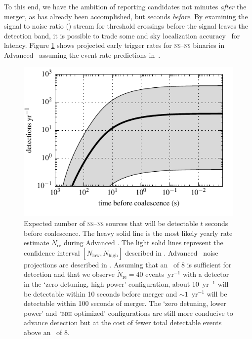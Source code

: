 To this end, we have the ambition of reporting \GW{} candidates
not minutes \emph{after} the merger, as has already been accomplished, but
seconds \emph{before}.  By examining the signal to noise ratio (\SNR{}) stream
for threshold crossings before the \GW{} signal leaves the
detection band, it is possible to trade some \SNR{} and sky localization
accuracy~\cite{Fairhurst2009} for latency.  Figure \ref{fig:earlywarning} shows
projected early trigger rates for \textsc{ns}--\textsc{ns} binaries in Advanced
\LIGO\ assuming the event rate predictions in~\cite{Abadie:2010p10836}.
%
\begin{figure}
\begin{center}
\includegraphics{figures/snr_in_time.pdf}
\caption{\label{fig:earlywarning} Expected number of \textsc{ns}--\textsc{ns} sources that will
be detectable $t$ seconds before coalescence.  The heavy solid line is the most
likely yearly rate estimate $\dot N_{\mathrm{re}}$ during Advanced \LIGO.  The
light solid lines represent the confidence interval $[\dot N_{\mathrm{low}}, \dot 
N_{\mathrm{high}}]$ described in
\cite{Abadie:2010p10836}.  Advanced \LIGO\ noise projections are described in 
\cite{ALIGONoise}.  Assuming that an \SNR\ of 8 is sufficient for
detection and that we observe $\dot N_{\mathrm{re}} = 40$ events~yr$^{-1}$ with a
detector in the `zero detuning, high power' configuration, about 10~yr$^{-1}$ will be 
detectable within 10 seconds before merger and $\sim1$~yr$^{-1}$ will be detectable 
within 100 seconds of merger.  The `zero detuning, lower power' and `\textsc{bbh} optimized' configurations are still more conducive to advance detection
but at the cost of fewer total detectable events above an \SNR\ of 8.}
\end{center}
\end{figure}

